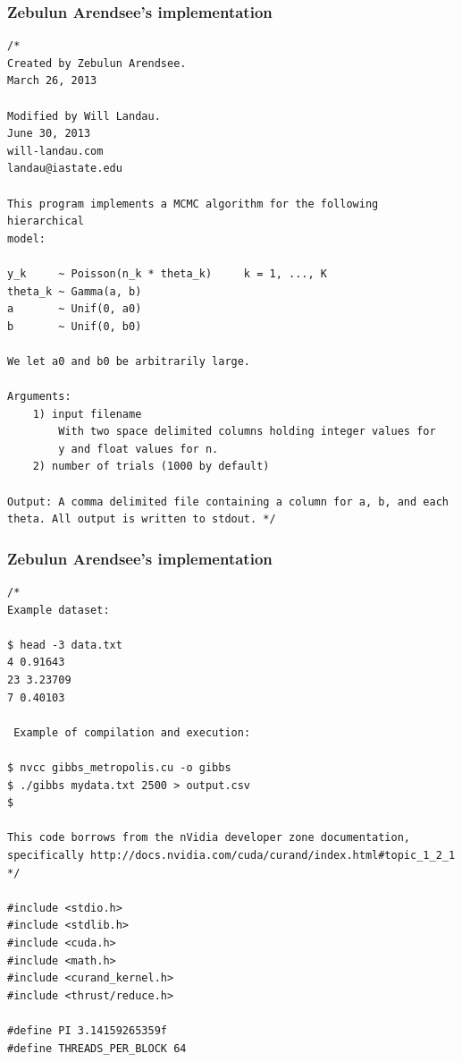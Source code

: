 \documentclass[handout]{beamer}
\numberwithin{equation}{section}
\begin{document}
\begin{frame}[fragile]
\frametitle{Zebulun Arendsee's implementation}
\begin{lstlisting}[name=mc]
/*
Created by Zebulun Arendsee.
March 26, 2013

Modified by Will Landau.
June 30, 2013
will-landau.com
landau@iastate.edu

This program implements a MCMC algorithm for the following hierarchical
model:

y_k     ~ Poisson(n_k * theta_k)     k = 1, ..., K
theta_k ~ Gamma(a, b)
a       ~ Unif(0, a0)
b       ~ Unif(0, b0) 

We let a0 and b0 be arbitrarily large.

Arguments:
    1) input filename
        With two space delimited columns holding integer values for
        y and float values for n.
    2) number of trials (1000 by default)

Output: A comma delimited file containing a column for a, b, and each
theta. All output is written to stdout. */
\end{lstlisting}
\end{frame}

\begin{frame}[fragile]
\frametitle{Zebulun Arendsee's implementation}
\begin{lstlisting}[name=mc]
/*
Example dataset:

$ head -3 data.txt
4 0.91643
23 3.23709
7 0.40103

 Example of compilation and execution:

$ nvcc gibbs_metropolis.cu -o gibbs
$ ./gibbs mydata.txt 2500 > output.csv
$

This code borrows from the nVidia developer zone documentation, 
specifically http://docs.nvidia.com/cuda/curand/index.html#topic_1_2_1
*/

#include <stdio.h>
#include <stdlib.h>
#include <cuda.h>
#include <math.h>
#include <curand_kernel.h>
#include <thrust/reduce.h>

#define PI 3.14159265359f
#define THREADS_PER_BLOCK 64
\end{lstlisting}
\end{frame}
\end{document}

